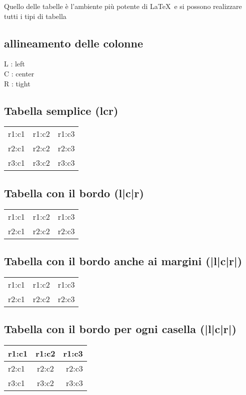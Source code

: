 \documentclass{article}
\begin{document}
Quello delle tabelle è l'ambiente più potente di \LaTeX\ e si possono realizzare tutti i tipi di tabella

\subsection{allineamento delle colonne}

L : left\\
C : center\\
R : tight\\

\subsection{Tabella semplice (lcr)}

\begin{tabular}{lcr}
r1:c1 & r1:c2 & r1:c3 \\
r2:c1 & r2:c2 & r2:c3\\
r3:c1 & r3:c2 & r3:c3
\end{tabular}

\subsection{Tabella con il bordo (l|c|r)}

\begin{tabular}{l|c|r}
r1:c1 & r1:c2 & r1:c3\\
r2:c1 & r2:c2 & r2:c3
\end{tabular}

\subsection{Tabella con il bordo anche ai margini (|l|c|r|)}

\begin{tabular}{|l|c|r|}
r1:c1 & r1:c2 & r1:c3\\
r2:c1 & r2:c2 & r2:c3
\end{tabular}

\subsection{Tabella con il bordo per ogni casella (|l|c|r|)}
\begin{tabular}{|l|c|r|}
\hline
r1:c1 & r1:c2 & r1:c3\\
\hline
r2:c1 & r2:c2 & r2:c3\\
\hline
r3:c1 & r3:c2 & r3:c3\\ %
\hline
\end{tabular}
\end{document}
